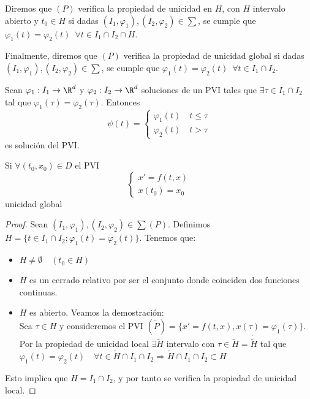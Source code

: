 \documentclass{article}
\begin{document}
Diremos que $(P)$ verifica la propiedad de unicidad en $H$, con $H$ intervalo abierto y $t_0 \in H$
si dadas $(I_1, \varphi_1), (I_2, \varphi_2) \in \sum$, se cumple que
$\varphi_1(t) = \varphi_2(t)\,\,\, \forall t \in I_1 \cap I_2 \cap H$.

Finalmente, diremos que $(P)$ verifica la propiedad de unicidad global si dadas
$(I_1, \varphi_1), (I_2, \varphi_2) \in \sum$, se cumple que $\varphi_1(t) =
\varphi_2(t)\,\,\, \forall t \in I_1 \cap I_2$.

\begin{lem}
  Sean $\varphi_1: I_1 \to \R^d$ y $\varphi_2: I_2 \to \R^d$ soluciones de un PVI tales que
  $\exists \tau \in I_1 \cap I_2$ tal que $\varphi_1(\tau) = \varphi_2(\tau)$.  Entonces
  \[
    \psi(t) = \left\{
      \begin{array}{l}
        \varphi_1(t) \quad t \leq \tau \\
        \varphi_2(t) \quad t > \tau
      \end{array}
    \right.
  \]
  es solución del PVI.
\end{lem}

\begin{lem}
  Si $\forall (t_0, x_0) \in D$ el PVI
  \[
    \left\{
      \begin{array}{l}
        x' = f(t,x) \\
        x(t_0) = x_0
      \end{array}
    \right.
  \]
  unicidad global
\end{lem}

\begin{proof}
  Sean $(I_1, \varphi_1), (I_2, \varphi_2) \in \sum (P)$. Definimos
  $H = \{ t \in I_1 \cap I_2; \varphi_1(t) = \varphi_2(t)\}$. Tenemos que:
  \begin{itemize}
  \item $H \neq \emptyset \quad (t_0 \in H)$
  \item $H$ es un cerrado relativo por ser el conjunto donde coinciden dos funciones continuas.
  \item $H$ es abierto. Veamos la demostración:\\
    Sea $\tau \in H$ y consideremos el PVI $(\tilde{P})=\{x'= f(t, x), x(\tau) =
    \varphi_1(\tau)\}$. Por la propiedad de unicidad local $\exists \tilde{H}$ intervalo con
    $\tau \in \tilde{H} = \dot{\tilde{H}}$ tal que
    $\varphi_1(t) = \varphi_2(t) \quad \forall t \in \tilde{H} \cap I_1 \cap I_2 \Rightarrow
    \tilde{H} \cap I_1 \cap I_2 \subset H$
  \end{itemize}
  Esto implica que $H = I_1 \cap I_2$, y por tanto se verifica la propiedad de unicidad local.
\end{proof}
\end{document}
